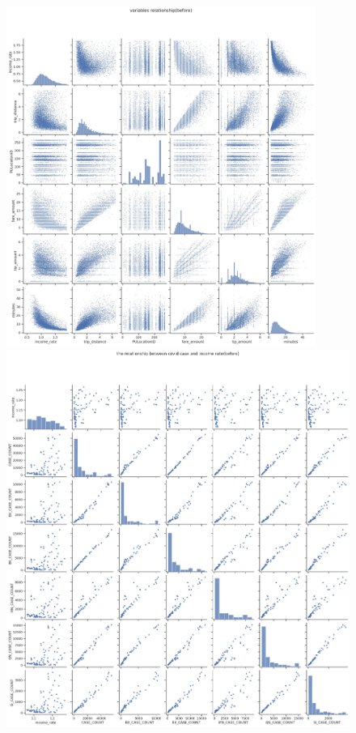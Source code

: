 \documentclass[11pt]{article}
\begin{document}
\begin{figure}[H]
\centering
\begin{minipage}{0.4\textwidth}
  \centering
  \includegraphics[width=0.9\textwidth]{plots/variables relationship(before).jpg}
  \caption{}
  \label{fig:by:table}
\end{minipage}%
\begin{minipage}{.4\textwidth}
  \centering
  \includegraphics[width=.9\textwidth]{plots/the relationship between covid case and income rate(before).jpg}
  \caption{}
  \label{fig:by:table}
\end{minipage}
\end{figure}
\end{document}
